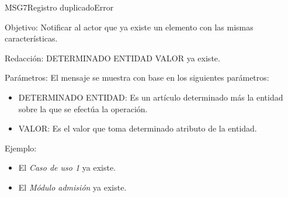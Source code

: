 \begin{mensaje}{MSG7}{Registro duplicado}{Error}
	\item [Objetivo:] Notificar al actor que ya existe un elemento con las mismas características.
	\item[Redacción:] DETERMINADO ENTIDAD VALOR ya existe.
	\item[Parámetros:] El mensaje se muestra con base en los siguientes parámetros:
		\begin{itemize}
 			\item DETERMINADO ENTIDAD: Es un artículo determinado más la entidad sobre la que se efectúa la operación.
 			\item VALOR: Es el valor que toma determinado atributo de la entidad.
		\end{itemize}
	\item[Ejemplo:] \begin{itemize}
		\item El {\em Caso de uso 1} ya existe.
		\item El {\em Módulo admisión} ya existe.
	\end{itemize}
\end{mensaje}